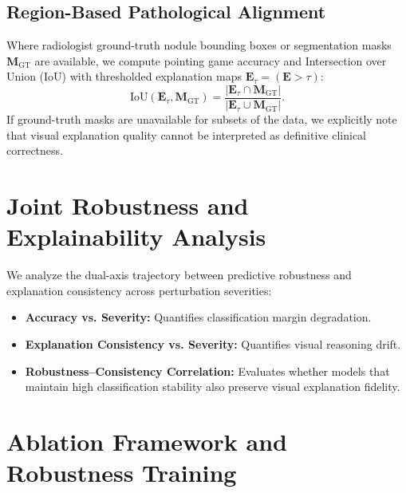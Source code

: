\documentclass[conference]{IEEEtran}
\begin{document}
\subsection{Region-Based Pathological Alignment}
Where radiologist ground-truth nodule bounding boxes or segmentation masks $\mathbf{M}_{\text{GT}}$ are available, we compute pointing game accuracy and Intersection over Union (IoU) with thresholded explanation maps $\mathbf{E}_{\tau} = (\mathbf{E} > \tau)$:
\begin{equation}
\text{IoU}(\mathbf{E}_{\tau}, \mathbf{M}_{\text{GT}}) = \frac{|\mathbf{E}_{\tau} \cap \mathbf{M}_{\text{GT}}|}{|\mathbf{E}_{\tau} \cup \mathbf{M}_{\text{GT}}|}.
\end{equation}
If ground-truth masks are unavailable for subsets of the data, we explicitly note that visual explanation quality cannot be interpreted as definitive clinical correctness.

\section{Joint Robustness and Explainability Analysis}
\label{sec:joint_analysis}

We analyze the dual-axis trajectory between predictive robustness and explanation consistency across perturbation severities:
\begin{itemize}
    \item \textbf{Accuracy vs. Severity:} Quantifies classification margin degradation.
    \item \textbf{Explanation Consistency vs. Severity:} Quantifies visual reasoning drift.
    \item \textbf{Robustness--Consistency Correlation:} Evaluates whether models that maintain high classification stability also preserve visual explanation fidelity.
\end{itemize}

\section{Ablation Framework and Robustness Training}
\label{sec:ablation}
\end{document}
